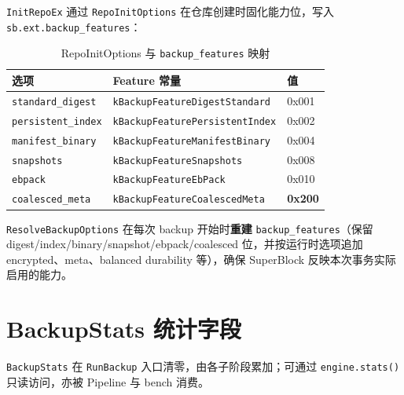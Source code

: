 \texttt{InitRepoEx} 通过 \texttt{RepoInitOptions} 在仓库创建时固化能力位，写入 \texttt{sb.ext.backup\_features}：

\begin{table}[htbp]
\centering
\caption{RepoInitOptions 与 \texttt{backup\_features} 映射}
\label{tab:repo-init-features}
\begin{tabular}{@{}lll@{}}
\toprule
选项 & Feature 常量 & 值 \\
\midrule
\texttt{standard\_digest} & \texttt{kBackupFeatureDigestStandard} & 0x001 \\
\texttt{persistent\_index} & \texttt{kBackupFeaturePersistentIndex} & 0x002 \\
\texttt{manifest\_binary} & \texttt{kBackupFeatureManifestBinary} & 0x004 \\
\texttt{snapshots} & \texttt{kBackupFeatureSnapshots} & 0x008 \\
\texttt{ebpack} & \texttt{kBackupFeatureEbPack} & 0x010 \\
\texttt{coalesced\_meta} & \texttt{kBackupFeatureCoalescedMeta} & \textbf{0x200} \\
\bottomrule
\end{tabular}
\end{table}

\texttt{ResolveBackupOptions} 在每次 backup 开始时\textbf{重建} \texttt{backup\_features}（保留 digest/index/binary/snapshot/ebpack/coalesced 位，并按运行时选项追加 encrypted、meta、balanced durability 等），确保 SuperBlock 反映本次事务实际启用的能力。

\section{BackupStats 统计字段}
\label{sec:be-stats}

\texttt{BackupStats} 在 \texttt{RunBackup} 入口清零，由各子阶段累加；可通过 \texttt{engine.stats()} 只读访问，亦被 Pipeline 与 bench 消费。

